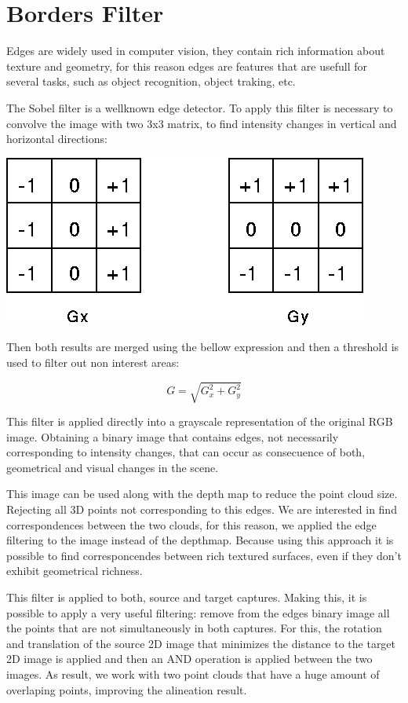 \section{Borders Filter}

Edges are widely used in computer vision, they contain rich information about texture 
and geometry, for this reason edges are features that are usefull for several tasks, 
such as object recognition, object traking, etc.


The Sobel filter is a wellknown edge detector. To apply this filter is necessary to 
convolve the image with two 3x3 matrix, to find intensity changes in vertical and 
horizontal directions:

\begin{center}
\includegraphics[scale=0.35]{images/sobel}
\end{center}

Then both results are merged using the bellow expression and then a threshold is used to filter out non interest areas:

$$ G = \sqrt{G_x^2+ G_y^2} $$

This filter is applied directly into a grayscale representation of the original RGB image. Obtaining a binary image 
that contains edges, not necessarily corresponding to intensity changes, that can occur as consecuence of both, geometrical 
and visual changes in the scene.


This image can be used along with the depth map to reduce the point cloud size. Rejecting all 3D points not corresponding
to this edges. We are interested in find correspondences between the two clouds, for this reason, we applied the edge filtering 
to the image instead of the depthmap. Because using this approach it is possible to find corresponcendes between rich textured 
surfaces, even if they don't exhibit geometrical richness.

This filter is applied to both, source and target captures. Making this, it is possible to apply a very useful filtering: remove 
from the edges binary image all the points that are not simultaneously in both captures. For this, the rotation and translation 
of the source 2D image that minimizes the distance to the target 2D image is applied and then an AND operation is applied between 
the two images. As result, we work with two point clouds that have a huge amount of overlaping points, improving the alineation 
result.


